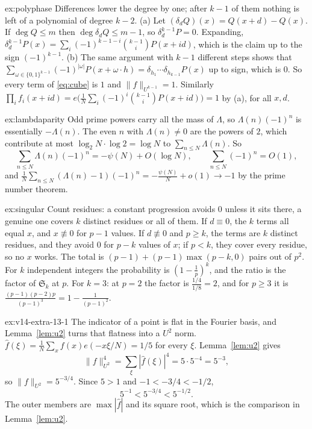 \begin{solution}{ex:polyphase}
\idea Differences lower the degree by one; after $k-1$ of them nothing is left of a polynomial of degree $k-2$.
\writeup (a) Let $(\delta_dQ)(x)=Q(x+d)-Q(x)$. If $\deg Q\le m$ then $\deg\delta_dQ\le m-1$, so $\delta_d^{k-1}P=0$. Expanding, $\delta_d^{k-1}P(x)=\sum_i(-1)^{k-1-i}\binom{k-1}iP(x+id)$, which is the claim up to the sign $(-1)^{k-1}$.
(b) The same argument with $k-1$ different steps shows that $\sum_{\omega\in\{0,1\}^{k-1}}(-1)^{|\omega|}P(x+\omega\cdot h)=\delta_{h_1}\cdots\delta_{h_{k-1}}P(x)$ up to sign, which is $0$. So every term of \eqref{eq:cube} is $1$ and $\|f\|_{U^{k-1}}=1$. Similarly $\prod_if_i(x+id)=e\bigl(\frac1N\sum_i(-1)^i\binom{k-1}iP(x+id)\bigr)=1$ by (a), for all $x,d$.
\end{solution}

\begin{solution}{ex:lambdaparity}
\idea Odd prime powers carry all the mass of $\Lambda$, so $\Lambda(n)(-1)^n$ is essentially $-\Lambda(n)$.
\writeup The even $n$ with $\Lambda(n)\ne0$ are the powers of $2$, which contribute at most $\log_2N\cdot\log2=\log N$ to $\sum_{n\le N}\Lambda(n)$. So
\[
\sum_{n\le N}\Lambda(n)(-1)^n=-\psi(N)+O(\log N),\qquad\sum_{n\le N}(-1)^n=O(1),
\]
and $\frac1N\sum_{n\le N}(\Lambda(n)-1)(-1)^n=-\frac{\psi(N)}N+o(1)\to-1$ by the prime number theorem.
\end{solution}

\begin{solution}{ex:singular}
\idea Count residues: a constant progression avoids $0$ unless it sits there, a genuine one covers $k$ distinct residues or all of them.
\writeup If $d\equiv0$, the $k$ terms all equal $x$, and $x\not\equiv0$ for $p-1$ values. If $d\not\equiv0$ and $p\ge k$, the terms are $k$ distinct residues, and they avoid $0$ for $p-k$ values of $x$; if $p<k$, they cover every residue, so no $x$ works. The total is $(p-1)+(p-1)\max(p-k,0)$ pairs out of $p^2$. For $k$ independent integers the probability is $(1-\frac1p)^k$, and the ratio is the factor of $\mathfrak S_k$ at $p$. For $k=3$: at $p=2$ the factor is $\frac{1/4}{1/8}=2$, and for $p\ge3$ it is $\frac{(p-1)(p-2)p}{(p-1)^3}=1-\frac1{(p-1)^2}$.
\end{solution}

\begin{solution}{ex:v14-extra-13-1}
\idea The indicator of a point is flat in the Fourier basis, and Lemma~\ref{lem:u2} turns that flatness into a $U^2$ norm.
\writeup $\hat f(\xi)=\frac1N\sum_{x}f(x)e(-x\xi/N)=1/5$ for every $\xi$. Lemma~\ref{lem:u2} gives
\[
\|f\|_{U^2}^4=\sum_{\xi}|\hat f(\xi)|^4=5\cdot5^{-4}=5^{-3},
\]
so $\|f\|_{U^2}=5^{-3/4}$. Since $5>1$ and $-1<-3/4<-1/2$,
\[
5^{-1}<5^{-3/4}<5^{-1/2}.
\]
The outer members are $\max|\hat f|$ and its square root, which is the comparison in Lemma~\ref{lem:u2}.
\end{solution}

